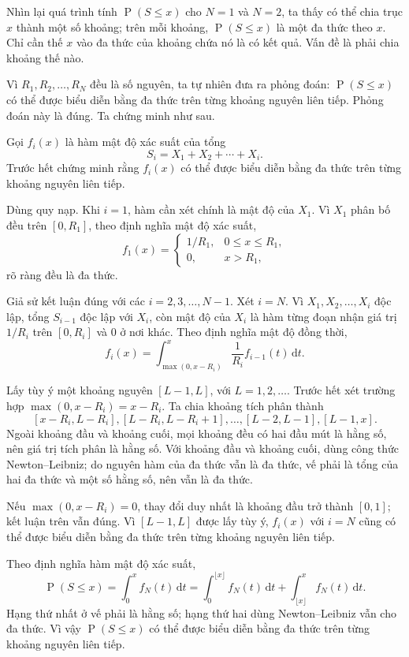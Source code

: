 \documentclass[11pt]{article}
\newcommand{\Prob}{\operatorname{P}}
\newcommand{\dd}{\,\mathrm{d}}
\begin{document}
Nhìn lại quá trình tính \(\Prob(S\le x)\) cho \(N=1\) và \(N=2\), ta thấy có
thể chia trục \(x\) thành một số khoảng; trên mỗi khoảng, \(\Prob(S\le x)\) là
một đa thức theo \(x\). Chỉ cần thế \(x\) vào đa thức của khoảng chứa nó là có
kết quả. Vấn đề là phải chia khoảng thế nào.

Vì \(R_1,R_2,\ldots,R_N\) đều là số nguyên, ta tự nhiên đưa ra phỏng đoán:
\(\Prob(S\le x)\) có thể được biểu diễn bằng đa thức trên từng khoảng nguyên
liên tiếp. Phỏng đoán này là đúng. Ta chứng minh như sau.

Gọi \(f_i(x)\) là hàm mật độ xác suất của tổng
\[
  S_i=X_1+X_2+\cdots+X_i.
\]
Trước hết chứng minh rằng \(f_i(x)\) có thể được biểu diễn bằng đa thức trên
từng khoảng nguyên liên tiếp.

Dùng quy nạp. Khi \(i=1\), hàm cần xét chính là mật độ của \(X_1\). Vì \(X_1\)
phân bố đều trên \([0,R_1]\), theo định nghĩa mật độ xác suất,
\[
  f_1(x)=
  \begin{cases}
    1/R_1, & 0\le x\le R_1,\\
    0, & x>R_1,
  \end{cases}
\]
rõ ràng đều là đa thức.

Giả sử kết luận đúng với các \(i=2,3,\ldots,N-1\). Xét \(i=N\). Vì
\(X_1,X_2,\ldots,X_i\) độc lập, tổng \(S_{i-1}\) độc lập với \(X_i\), còn mật
độ của \(X_i\) là hàm từng đoạn nhận giá trị \(1/R_i\) trên \([0,R_i]\) và
\(0\) ở nơi khác. Theo định nghĩa mật độ đồng thời,
\[
  f_i(x)
  =
  \int_{\max(0,x-R_i)}^{x}
  \frac1{R_i}f_{i-1}(t)\dd t.
\]

Lấy tùy ý một khoảng nguyên \([L-1,L]\), với \(L=1,2,\ldots\). Trước hết xét
trường hợp \(\max(0,x-R_i)=x-R_i\). Ta chia khoảng tích phân thành
\[
  [x-R_i,L-R_i], [L-R_i,L-R_i+1],\ldots,[L-2,L-1],[L-1,x].
\]
Ngoài khoảng đầu và khoảng cuối, mọi khoảng đều có hai đầu mút là hằng số, nên
giá trị tích phân là hằng số. Với khoảng đầu và khoảng cuối, dùng công thức
Newton--Leibniz; do nguyên hàm của đa thức vẫn là đa thức, vế phải là tổng của
hai đa thức và một số hằng số, nên vẫn là đa thức.

Nếu \(\max(0,x-R_i)=0\), thay đổi duy nhất là khoảng đầu trở thành \([0,1]\);
kết luận trên vẫn đúng. Vì \([L-1,L]\) được lấy tùy ý, \(f_i(x)\) với \(i=N\)
cũng có thể được biểu diễn bằng đa thức trên từng khoảng nguyên liên tiếp.

Theo định nghĩa hàm mật độ xác suất,
\[
  \Prob(S\le x)
  =
  \int_0^x f_N(t)\dd t
  =
  \int_0^{\lfloor x\rfloor}f_N(t)\dd t
  +
  \int_{\lfloor x\rfloor}^{x}f_N(t)\dd t.
\]
Hạng thứ nhất ở vế phải là hằng số; hạng thứ hai dùng Newton--Leibniz vẫn cho
đa thức. Vì vậy \(\Prob(S\le x)\) có thể được biểu diễn bằng đa thức trên từng
khoảng nguyên liên tiếp.
\end{document}
